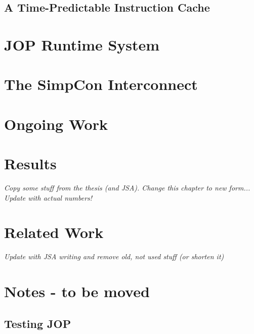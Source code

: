 \clearpage
    
\clearpage
    

\clearpage
    \section{A Time-Predictable Instruction Cache}
    \label{sec:cache}
    

\chapter{JOP Runtime System}
\label{chap:runtime}

    
    
    
    
    
    \label{sec:gc}
    

\chapter{The SimpCon Interconnect}
\label{chap:simpcon}
\newcommand{\scgrsc}{.65}
\newcommand{\scgrp}{simpcon}




\chapter{Ongoing Work}
\label{chap:ongoing}
    

\chapter{Results}
\emph{Copy some stuff from the thesis (and JSA). Change this chapter
to new form... Update with actual numbers!}

\label{chap:results}
    

\chapter{Related Work}
\label{chap:related}

\emph{Update with JSA writing and remove old, not used stuff (or
shorten it)}
    


\chapter{Notes - to be moved}

\section{Testing JOP}

